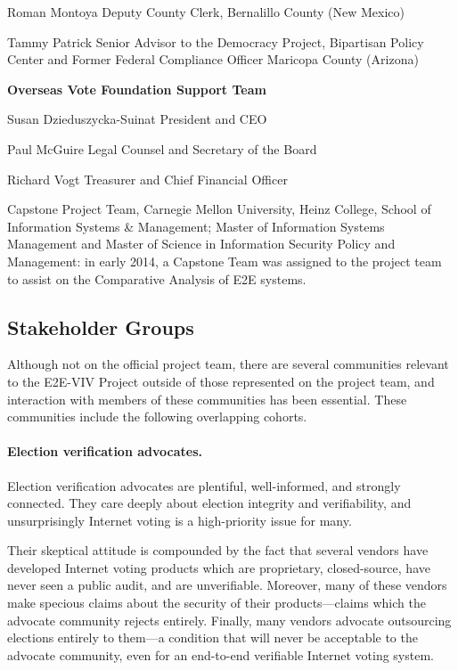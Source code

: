 Roman Montoya
Deputy County Clerk, Bernalillo County (New Mexico)
 
Tammy Patrick
Senior Advisor to the Democracy Project, Bipartisan Policy Center and Former Federal Compliance Officer Maricopa County (Arizona)
 
\textbf{Overseas Vote Foundation Support Team}

Susan Dzieduszycka-Suinat
President and CEO
 
Paul McGuire
Legal Counsel and Secretary of the Board
 
Richard Vogt
Treasurer and Chief Financial Officer

Capstone Project Team, Carnegie Mellon University, Heinz College,
School of Information Systems \& Management; Master of Information
Systems Management and Master of Science in Information Security
Policy and Management: in early 2014, a Capstone Team was assigned to
the project team to assist on the Comparative Analysis of E2E systems.

\subsection{Stakeholder Groups}
\label{sec:stakeholder-groups}

Although not on the official project team, there are several
communities relevant to the E2E-VIV Project outside of those
represented on the project team, and interaction with members of these
communities has been essential. These communities include the
following overlapping cohorts.

\paragraph{Election verification advocates.} Election verification
advocates are plentiful, well-informed, and strongly connected.  They
care deeply about election integrity and verifiability, and
unsurprisingly Internet voting is a high-priority issue for many.

Their skeptical attitude is compounded by the fact that several vendors
have developed Internet voting products which are proprietary,
closed-source, have never seen a public audit, and are
unverifiable. Moreover, many of these vendors make specious claims
about the security of their products---claims which the advocate
community rejects entirely. Finally, many vendors advocate outsourcing
elections entirely to them---a condition that will never be acceptable
to the advocate community, even for an end-to-end verifiable Internet
voting system.

